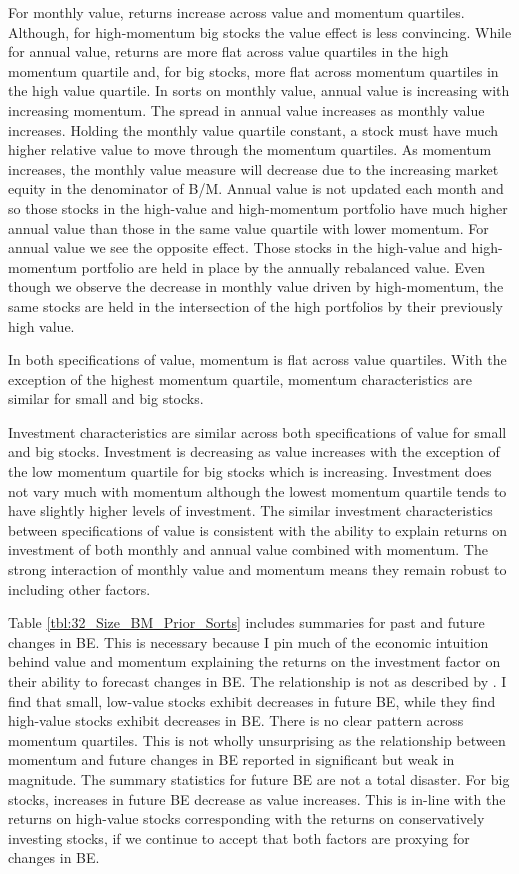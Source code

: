 For monthly value, returns increase across value and momentum quartiles. Although, for
high-momentum big stocks the value effect is less convincing. While for annual value,
returns are more flat across value quartiles in the high momentum quartile and, for big
stocks, more flat across momentum quartiles in the high value quartile. In sorts on
monthly value, annual value is increasing with increasing momentum. The spread in annual
value increases as monthly value increases. Holding the monthly value quartile constant, a
stock must have much higher relative value to move through the momentum quartiles. As
momentum increases, the monthly value measure will decrease due to the increasing market
equity in the denominator of B/M. Annual value is not updated each month and so those
stocks in the high-value and high-momentum portfolio have much higher annual value than
those in the same value quartile with lower momentum. For annual value we see the opposite
effect. Those stocks in the high-value and high-momentum portfolio are held in place by
the annually rebalanced value. Even though we observe the decrease in monthly value driven
by high-momentum, the same stocks are held in the intersection of the high portfolios by
their previously high value.

In both specifications of value, momentum is flat across value quartiles. With the
exception of the highest momentum quartile, momentum characteristics are similar for small
and big stocks.

Investment characteristics are similar across both specifications of value for small and
big stocks. Investment is decreasing as value increases with the exception of the low
momentum quartile for big stocks which is increasing. Investment does not vary much with
momentum although the lowest momentum quartile tends to have slightly higher levels of
investment. The similar investment characteristics between specifications of value is
consistent with the ability to explain returns on investment of both monthly and annual
value combined with momentum. The strong interaction of monthly value and momentum means
they remain robust to including other factors.

Table \ref{tbl:32_Size_BM_Prior_Sorts} includes summaries for past and future changes in
BE. This is necessary because I pin much of the economic intuition behind value and
momentum explaining the returns on the investment factor on their ability to forecast
changes in BE. The relationship is not as described by \textcite{kok2017facts}. I find
that small, low-value stocks exhibit decreases in future BE, while they find high-value
stocks exhibit decreases in BE. There is no clear pattern across momentum quartiles. This
is not wholly unsurprising as the relationship between momentum and future changes in BE
reported in \textcite{asness2013devil} significant but weak in magnitude. The summary
statistics for future BE are not a total disaster. For big stocks, increases in future BE
decrease as value increases. This is in-line with the returns on high-value stocks
corresponding with the returns on conservatively investing stocks, if we continue to
accept that both factors are proxying for changes in BE.

